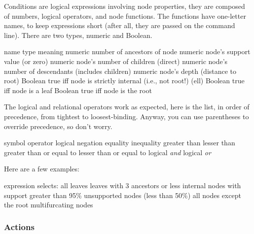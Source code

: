 Conditions are logical expressions involving node properties, they are composed
of numbers, logical operators, and node functions.  The functions have
one-letter names, to keep expressions short (after all, they are passed on the
command line). There are two types, numeric and Boolean.

\startalignment[center]
	\starttabulate[|c|l|l|]
		\NC name \NC type \NC meaning \NC\NR
		\HL
		\NC {} \NC numeric \NC number of ancestors of node	 \NC\NR
		\NC {} \NC numeric \NC node's support value (or zero) \NC\NR
		\NC {} \NC numeric \NC node's number of children (direct) \NC\NR
		\NC {} \NC numeric \NC node's number of descendants (includes children) \NC\NR
		\NC {} \NC numeric \NC node's depth (distance to root) \NC\NR
		\NC {} \NC Boolean \NC true iff node is strictly internal (i.e., not root!) \NC\NR
		\NC {} (ell) \NC Boolean \NC true iff node is a leaf \NC\NR
		\NC {} \NC Boolean \NC true iff node is the root \NC\NR
	\stoptabulate
\stopalignment

The logical and relational operators work as expected, here is the list, in
order of precedence, from tightest to loosest-binding.  Anyway, you can use
parentheses to override precedence, so don't worry.

\startalignment[center]
	\starttabulate[|c|l|]
		\NC symbol 		\NC operator \NC\NR
		\HL
		\NC \code{!} 	\NC logical negation \NC\NR
		\HL
		\NC \code{==}	\NC equality \NC\NR
		\NC \code{!=} \NC inequality \NC\NR
		\NC \code{<} 	\NC greater than \NC\NR
		\NC \code{>} 	\NC lesser than \NC\NR
		\NC \code{>=} \NC greater than or equal to \NC\NR
		\NC \code{<=} \NC lesser than or equal to \NC\NR
		\HL
		\NC \code{\&} \NC logical {\em and} \NC\NR
		\HL
		\NC \code{\|} 	\NC logical {\em or} \NC\NR
	\stoptabulate
\stopalignment

Here are a few examples:

\startalignment[center]
	\starttabulate[|c|l|]
		\NC expression \NC selects: \NC\NR
		\HL
		\NC {} \NC all leaves \NC\NR
		\NC {} \NC leaves with 3 ancestors or less \NC\NR
		\NC {} \NC internal nodes with support greater than 95\% \NC\NR 
		\NC {} \NC unsupported nodes (less than 50\%) \NC\NR
		\NC {} \NC all nodes except the root \NC\NR
		\NC {} \NC multifurcating nodes \NC\NR
	\stoptabulate
\stopalignment

\subsubsection{Actions}

